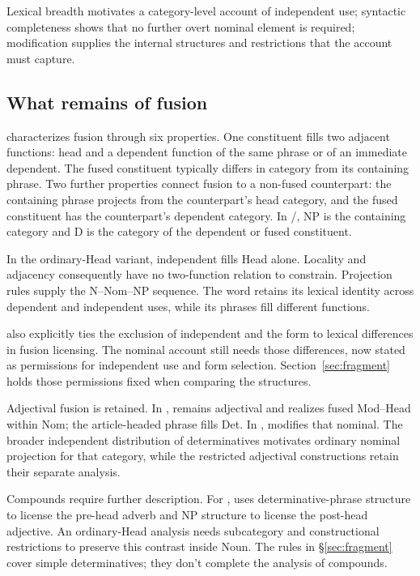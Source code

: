 \documentclass[12pt]{article}
\begin{document}
Lexical breadth motivates a category-level account of independent use; syntactic completeness shows that no further overt nominal element is required; modification supplies the internal structures and restrictions that the account must capture.

\subsection{What remains of fusion}

\textcite{Payne2007} characterizes fusion through six properties. One constituent fills two adjacent functions: head and a dependent function of the same phrase or of an immediate dependent. The fused constituent typically differs in category from its containing phrase. Two further properties connect fusion to a non-fused counterpart: the containing phrase projects from the counterpart's head category, and the fused constituent has the counterpart's dependent category. In /, NP is the containing category and D is the category of the dependent or fused constituent.

In the ordinary-Head variant, independent  fills Head alone. Locality and adjacency consequently have no two-function relation to constrain. Projection rules supply the N--Nom--NP sequence. The word  retains its lexical identity across dependent and independent uses, while its phrases fill different functions.

\textcite{Payne2007} also explicitly ties the exclusion of independent  and the form  to lexical differences in fusion licensing. The nominal account still needs those differences, now stated as permissions for independent use and form selection. Section~\ref{sec:fragment} holds those permissions fixed when comparing the structures.

Adjectival fusion is retained. In ,  remains adjectival and realizes fused Mod--Head within Nom; the article-headed phrase fills Det. In ,  modifies that nominal. The broader independent distribution of determinatives motivates ordinary nominal projection for that category, while the restricted adjectival constructions retain their separate analysis.

Compounds require further description. For , \textcite{Payne2007} uses determinative-phrase structure to license the pre-head adverb and NP structure to license the post-head adjective. An ordinary-Head analysis needs subcategory and constructional restrictions to preserve this contrast inside Noun. The rules in §\ref{sec:fragment} cover simple determinatives; they don't complete the analysis of compounds.
\end{document}
